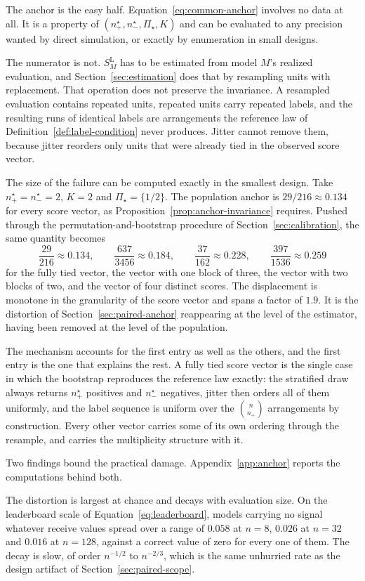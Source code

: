 \documentclass[11pt]{article}
\newcommand{\PSet}{\Pi_\star}
\newcommand{\SLead}{S^{\mathrm{L}}}
\theoremstyle{remark}
\begin{document}
The anchor is the easy half. Equation~\eqref{eq:common-anchor} involves no data at all. It is a property of $(n^\star_+,n^\star_-,\PSet,K)$ and can be evaluated to any precision wanted by direct simulation, or exactly by enumeration in small designs.

The numerator is not. $\SLead_M$ has to be estimated from model $M$'s realized evaluation, and Section~\ref{sec:estimation} does that by resampling units with replacement. That operation does not preserve the invariance. A resampled evaluation contains repeated units, repeated units carry repeated labels, and the resulting runs of identical labels are arrangements the reference law of Definition~\ref{def:label-condition} never produces. Jitter cannot remove them, because jitter reorders only units that were already tied in the observed score vector.

The size of the failure can be computed exactly in the smallest design. Take $n^\star_+=n^\star_-=2$, $K=2$ and $\PSet=\{1/2\}$. The population anchor is $29/216\approx0.134$ for every score vector, as Proposition~\ref{prop:anchor-invariance} requires. Pushed through the permutation-and-bootstrap procedure of Section~\ref{sec:calibration}, the same quantity becomes
\[
\frac{29}{216}\approx0.134,
\qquad
\frac{637}{3456}\approx0.184,
\qquad
\frac{37}{162}\approx0.228,
\qquad
\frac{397}{1536}\approx0.259
\]
for the fully tied vector, the vector with one block of three, the vector with two blocks of two, and the vector of four distinct scores. The displacement is monotone in the granularity of the score vector and spans a factor of $1.9$. It is the distortion of Section~\ref{sec:paired-anchor} reappearing at the level of the estimator, having been removed at the level of the population.

The mechanism accounts for the first entry as well as the others, and the first entry is the one that explains the rest. A fully tied score vector is the single case in which the bootstrap reproduces the reference law exactly: the stratified draw always returns $n^\star_+$ positives and $n^\star_-$ negatives, jitter then orders all of them uniformly, and the label sequence is uniform over the $\binom{n}{n_+}$ arrangements by construction. Every other vector carries some of its own ordering through the resample, and carries the multiplicity structure with it.

Two findings bound the practical damage. Appendix~\ref{app:anchor} reports the computations behind both.

The distortion is largest at chance and decays with evaluation size. On the leaderboard scale of Equation~\eqref{eq:leaderboard}, models carrying no signal whatever receive values spread over a range of $0.058$ at $n=8$, $0.026$ at $n=32$ and $0.016$ at $n=128$, against a correct value of zero for every one of them. The decay is slow, of order $n^{-1/2}$ to $n^{-2/3}$, which is the same unhurried rate as the design artifact of Section~\ref{sec:paired-scope}.
\end{document}
